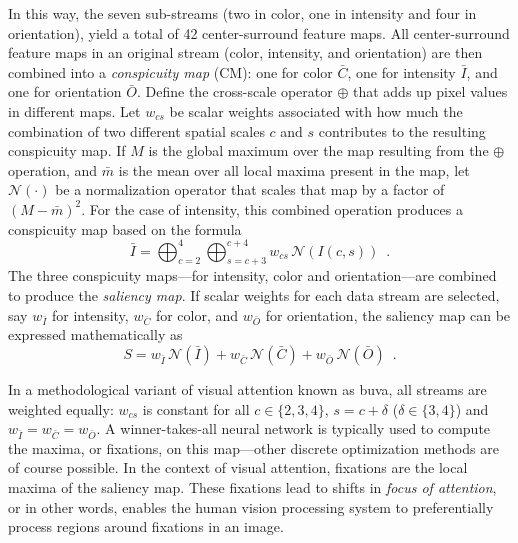 \documentclass {udthesis}
\begin{document}
In this way, the seven sub-streams (two in color, one in intensity and four in orientation), 
yield a total of 42 center-surround feature maps.
All center-surround feature maps in an original stream (color, intensity,
and orientation) are then combined into a \emph{conspicuity map} (CM):
one for color $\bar{C}$, one for intensity $\bar{I}$, and one for orientation $\bar{O}$. 
Define the cross-scale operator $\oplus$ that adds up pixel values in different maps. 
Let $w_{cs}$ be scalar weights associated with how much the combination of
two different spatial scales $c$ and $s$ contributes to the resulting conspicuity map.
If $M$ is the global maximum over the map resulting from the $\oplus$ operation, and $\bar{m}$ is the mean over
all local maxima present in the map, let $\mathcal{N}(\cdot)$ be a normalization operator that scales that map by a factor of $(M-\bar{m})^{2}$.
For the case of intensity, this combined operation produces a conspicuity map based on the formula
%
\begin{equation} \label{eq:feature_map}
 \bar{I}=\bigoplus_{c=2}^{4} \bigoplus_{s=c+3}^{c+4}w_{cs}\,\mathcal{N}(I(c,s))
\enspace.
\end{equation}
%
The three conspicuity maps---for intensity, color and orientation---are combined to produce the \emph{saliency map}.
If scalar weights for each data stream are selected, say
$w_{\bar{I}}$ for intensity, $w_{\bar{C}}$ for color, and 
$w_{\bar{O}}$ for orientation, the saliency map can be expressed mathematically as
%
\begin{equation} \label{eq:saliency_map}
 S=w_{\bar{I}}\,\mathcal{N}(\bar{I})+w_{\bar{C}}\,\mathcal{N}(\bar{C})+
 w_{\bar{O}}\,\mathcal{N}(\bar{O}) \enspace.
\end{equation}
%

In a methodological variant of visual attention known as \gls{buva}, all streams are weighted equally: $w_{cs}$ is constant for all $c\in\{2,3,4\}$,  $s=c+\delta$ ($\delta\in\{3,4\}$)
and $w_{\bar{I}}=w_{\bar{C}}=w_{\bar{O}}$. 
A winner-takes-all neural network is typically used \cite{itti,walther} 
to compute the maxima, or fixations, on this map---other discrete optimization methods are of course possible.
In the context of visual attention, fixations are the local maxima of the saliency map.  
These fixations lead to shifts in \emph{focus of attention}, or in other words, 
enables the human vision processing system to preferentially process regions 
around fixations in an image.
\end{document}
